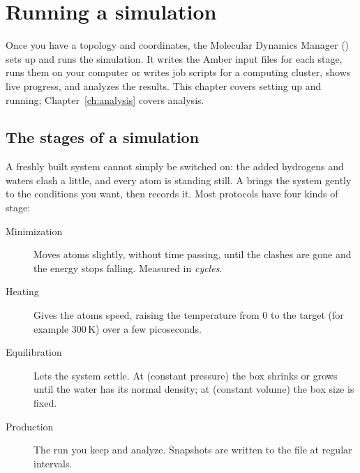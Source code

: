 \chapter{Running a simulation}
\label{ch:runningmd}

Once you have a topology and coordinates, the Molecular Dynamics Manager
() sets up and runs the simulation. It writes the Amber input files for
each stage, runs them on your computer or writes job scripts for a computing
cluster, shows live progress, and analyzes the results. This chapter covers
setting up and running; Chapter~\ref{ch:analysis} covers analysis.

\begin{glance}
\end{glance}

\section{The stages of a simulation}\label{sec:runningmd-stages}

A freshly built system cannot simply be switched on: the added hydrogens and
waters clash a little, and every atom is standing still. A 
brings the system gently to the conditions you want, then records it. Most
protocols have four kinds of stage:

\begin{description}
  \item[Minimization] Moves atoms slightly, without time passing, until the
        clashes are gone and the energy stops falling. Measured in
        \emph{cycles}.
  \item[Heating] Gives the atoms speed, raising the temperature from 0 to the
        target (for example 300\,K) over a few picoseconds.
  \item[Equilibration] Lets the system settle. At  (constant
        pressure) the box shrinks or grows until the water has its normal
        density; at  (constant volume) the box size is fixed.
  \item[Production] The run you keep and analyze. Snapshots are written to
        the  file at regular intervals.
\end{description}

